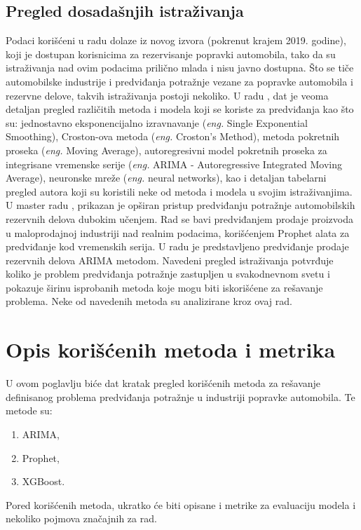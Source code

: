 \documentclass[12pt,oneside]{memoir}
\begin{document}
\section{Pregled dosadašnjih istraživanja}
Podaci korišćeni u radu dolaze iz novog izvora (pokrenut krajem 2019. godine), koji je dostupan korisnicima za rezervisanje popravki automobila, tako da su istraživanja nad ovim podacima prilično mlada i nisu javno dostupna. Što se tiče automobilske industrije i predviđanja potražnje vezane za popravke automobila i rezervne delove, takvih istraživanja postoji nekoliko. U radu \cite{callegaro2010forecasting}, dat je veoma detaljan pregled različitih metoda i modela koji se koriste za predviđanja kao što su: jednostavno eksponencijalno izravnavanje (\textit{eng.} Single Exponential Smoothing), Croston-ova metoda (\textit{eng.} Croston's Method), metoda pokretnih proseka (\textit{eng.} Moving Average), autoregresivni model pokretnih proseka za integrisane vremenske serije (\textit{eng.} ARIMA - Autoregressive Integrated Moving Average), neuronske mreže (\textit{eng.} neural networks), kao i detaljan tabelarni pregled autora koji su koristili neke od metoda i modela u svojim istraživanjima. U master radu \cite{henkelmann2018deep}, prikazan je opširan pristup predviđanju potražnje automobilskih rezervnih delova dubokim učenjem. Rad \cite{zunic2020application} se bavi predviđanjem prodaje proizvoda u maloprodajnoj industriji nad realnim podacima, korišćenjem Prophet alata za predviđanje kod vremenskih serija. U radu \cite{saravanan2019forecasting} je predstavljeno predviđanje prodaje rezervnih delova ARIMA metodom. Navedeni pregled istraživanja potvrđuje koliko je problem predviđanja potražnje zastupljen u svakodnevnom svetu i pokazuje širinu isprobanih metoda koje mogu biti iskorišćene za rešavanje problema. Neke od navedenih metoda su analizirane kroz ovaj rad.

\chapter{Opis korišćenih metoda i metrika}
\label{chp:metode}
U ovom poglavlju biće dat kratak pregled korišćenih metoda za rešavanje definisanog problema predviđanja potražnje u industriji popravke automobila. Te metode su: 
\begin{enumerate}
    \item ARIMA,
    \item Prophet,
    \item XGBoost.
\end{enumerate}
Pored korišćenih metoda, ukratko će biti opisane i metrike za evaluaciju modela i nekoliko pojmova značajnih za rad.
\end{document}
